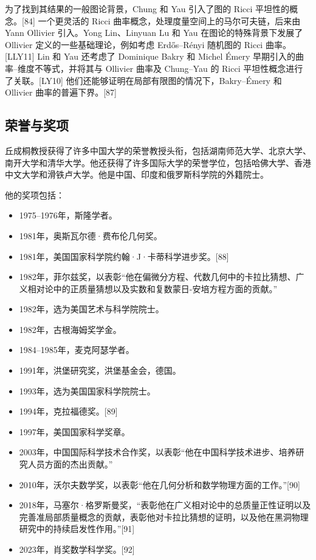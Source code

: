 为了找到其结果的一般图论背景，Chung 和 Yau 引入了图的 Ricci 平坦性的概念。[84] 一个更灵活的 Ricci 曲率概念，处理度量空间上的马尔可夫链，后来由 Yann Ollivier 引入。Yong Lin、Linyuan Lu 和 Yau 在图论的特殊背景下发展了 Ollivier 定义的一些基础理论，例如考虑 Erdős–Rényi 随机图的 Ricci 曲率。[LLY11] Lin 和 Yau 还考虑了 Dominique Bakry 和 Michel Émery 早期引入的曲率–维度不等式，并将其与 Ollivier 曲率及 Chung–Yau 的 Ricci 平坦性概念进行了关联。[LY10] 他们还能够证明在局部有限图的情况下，Bakry–Émery 和 Ollivier 曲率的普遍下界。[87]
\subsection{荣誉与奖项}  
丘成桐教授获得了许多中国大学的荣誉教授头衔，包括湖南师范大学、北京大学、南开大学和清华大学。他还获得了许多国际大学的荣誉学位，包括哈佛大学、香港中文大学和滑铁卢大学。他是中国、印度和俄罗斯科学院的外籍院士。

他的奖项包括：
\begin{itemize}
\item 1975–1976年，斯隆学者。
\item 1981年，奥斯瓦尔德·费布伦几何奖。
\item 1981年，美国国家科学院约翰·J·卡蒂科学进步奖。[88]
\item 1982年，菲尔兹奖，以表彰“他在偏微分方程、代数几何中的卡拉比猜想、广义相对论中的正质量猜想以及实数和复数蒙日-安培方程方面的贡献。”
\item 1982年，选为美国艺术与科学院院士。
\item 1982年，古根海姆奖学金。
\item 1984–1985年，麦克阿瑟学者。
\item 1991年，洪堡研究奖，洪堡基金会，德国。
\item 1993年，选为美国国家科学院院士。
\item 1994年，克拉福德奖。[89]
\item 1997年，美国国家科学奖章。
\item 2003年，中国国际科学技术合作奖，以表彰“他在中国科学技术进步、培养研究人员方面的杰出贡献。”
\item 2010年，沃尔夫数学奖，以表彰“他在几何分析和数学物理方面的工作。”[90]
\item 2018年，马塞尔·格罗斯曼奖，“表彰他在广义相对论中的总质量正性证明以及完善准局部质量概念的贡献，表彰他对卡拉比猜想的证明，以及他在黑洞物理研究中的持续启发性作用。”[91]
\item 2023年，肖奖数学科学奖。[92]
\end{itemize}
